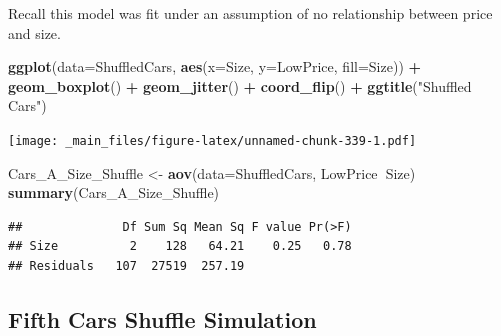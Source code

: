 \documentclass[]{book}
\newenvironment{Shaded}{\begin{snugshade}}{\end{snugshade}}
\newcommand{\KeywordTok}[1]{\textcolor[rgb]{0.13,0.29,0.53}{\textbf{#1}}}
\newcommand{\DataTypeTok}[1]{\textcolor[rgb]{0.13,0.29,0.53}{#1}}
\newcommand{\DecValTok}[1]{\textcolor[rgb]{0.00,0.00,0.81}{#1}}
\newcommand{\StringTok}[1]{\textcolor[rgb]{0.31,0.60,0.02}{#1}}
\newcommand{\OperatorTok}[1]{\textcolor[rgb]{0.81,0.36,0.00}{\textbf{#1}}}
\newcommand{\NormalTok}[1]{#1}
\begin{document}
Recall this model was fit under an assumption of no relationship between
price and size.

\begin{Shaded}
\begin{Highlighting}[]
\KeywordTok{ggplot}\NormalTok{(}\DataTypeTok{data=}\NormalTok{ShuffledCars, }\KeywordTok{aes}\NormalTok{(}\DataTypeTok{x=}\NormalTok{Size, }\DataTypeTok{y=}\NormalTok{LowPrice, }\DataTypeTok{fill=}\NormalTok{Size)) }\OperatorTok{+}\StringTok{ }
\StringTok{  }\KeywordTok{geom_boxplot}\NormalTok{() }\OperatorTok{+}\StringTok{ }\KeywordTok{geom_jitter}\NormalTok{() }\OperatorTok{+}\StringTok{ }\KeywordTok{coord_flip}\NormalTok{() }\OperatorTok{+}\StringTok{ }\KeywordTok{ggtitle}\NormalTok{(}\StringTok{"Shuffled Cars"}\NormalTok{)}
\end{Highlighting}
\end{Shaded}

\texttt{[image: \_main\_files/figure-latex/unnamed-chunk-339-1.pdf]}

\begin{Shaded}
\begin{Highlighting}[]
\NormalTok{Cars_A_Size_Shuffle <-}\StringTok{ }\KeywordTok{aov}\NormalTok{(}\DataTypeTok{data=}\NormalTok{ShuffledCars, LowPrice}\OperatorTok{~}\NormalTok{Size)}
\KeywordTok{summary}\NormalTok{(Cars_A_Size_Shuffle)}
\end{Highlighting}
\end{Shaded}

\begin{verbatim}
##              Df Sum Sq Mean Sq F value Pr(>F)
## Size          2    128   64.21    0.25   0.78
## Residuals   107  27519  257.19
\end{verbatim}

\subsection{Fifth Cars Shuffle
Simulation}\label{fifth-cars-shuffle-simulation-1}

\begin{Shaded}
\end{Shaded}
\end{document}
